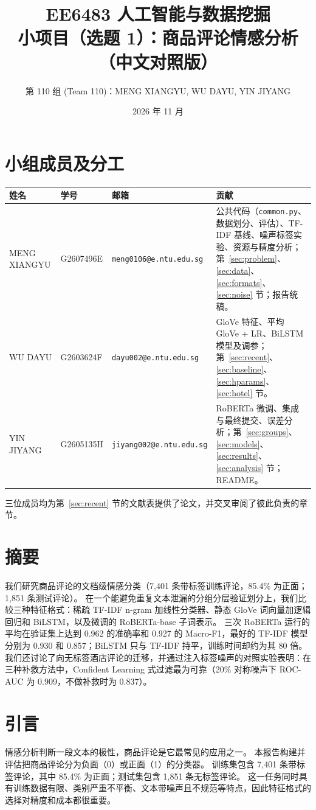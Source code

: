 \documentclass[11pt,a4paper]{article}
\title{EE6483 人工智能与数据挖掘\\小项目（选题 1）：商品评论情感分析\\\large （中文对照版）}
\author{第 110 组 (Team 110)：MENG XIANGYU, WU DAYU, YIN JIYANG}
\date{2026 年 11 月}
\renewcommand{\abstractname}{摘要}
\renewenvironment{abstract}{\section*{\abstractname}}{}
\begin{document}
\vspace*{-1.8cm}
{\let\newpage\relax\maketitle}
\vspace{-0.6cm}

\section*{小组成员及分工}
\begin{table}[h]
\centering
\small
\begin{tabularx}{\textwidth}{l l l Y}
\toprule
姓名 & 学号 & 邮箱 & 贡献 \\
\midrule
MENG XIANGYU & G2607496E & \texttt{\footnotesize meng0106@e.ntu.edu.sg} & 公共代码（\texttt{common.py}、数据划分、评估）、TF-IDF 基线、噪声标签实验、资源与精度分析；第~\ref{sec:problem}、\ref{sec:data}、\ref{sec:formats}、\ref{sec:noise} 节；报告统稿。 \\
WU DAYU & G2603624F & \texttt{\footnotesize dayu002@e.ntu.edu.sg} & GloVe 特征、平均 GloVe + LR、BiLSTM 模型及调参；第~\ref{sec:recent}、\ref{sec:baseline}、\ref{sec:hparams}、\ref{sec:hotel} 节。 \\
YIN JIYANG & G2605135H & \texttt{\footnotesize jiyang002@e.ntu.edu.sg} & RoBERTa 微调、集成与最终提交、误差分析；第~\ref{sec:groups}、\ref{sec:models}、\ref{sec:results}、\ref{sec:analysis} 节；README。 \\
\bottomrule
\end{tabularx}
\end{table}
三位成员均为第~\ref{sec:recent} 节的文献表提供了论文，并交叉审阅了彼此负责的章节。

\begin{abstract}
我们研究商品评论的文档级情感分类（7{,}401 条带标签训练评论，85.4\% 为正面；1{,}851 条测试评论）。
在一个能避免重复文本泄漏的分组分层验证划分上，我们比较三种特征格式：稀疏 TF-IDF n-gram 加线性分类器、静态 GloVe 词向量加逻辑回归和 BiLSTM，以及微调的 RoBERTa-base 子词表示。
三次 RoBERTa 运行的平均在验证集上达到 0.962 的准确率和 0.927 的 Macro-F1，最好的 TF-IDF 模型分别为 0.930 和 0.857；BiLSTM 只与 TF-IDF 持平，训练时间却约为其 80 倍。
我们还讨论了向无标签酒店评论的迁移，并通过注入标签噪声的对照实验表明：在三种补救方法中，Confident Learning 式过滤最为可靠（20\% 对称噪声下 ROC-AUC 为 0.909，不做补救时为 0.837）。
\end{abstract}

\section{引言}\label{sec:intro}
情感分析判断一段文本的极性，商品评论是它最常见的应用之一。
本报告构建并评估把商品评论分为负面（0）或正面（1）的分类器。
训练集包含 7{,}401 条带标签评论，其中 85.4\% 为正面；测试集包含 1{,}851 条无标签评论。
这一任务同时具有训练数据有限、类别严重不平衡、文本带噪声且不规范等特点，因此特征格式的选择对精度和成本都很重要。
\end{document}
